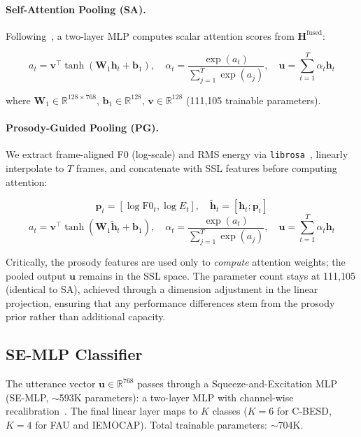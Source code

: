 \documentclass[11pt,a4paper]{article}
\begin{document}
\paragraph{Self-Attention Pooling (SA).}
Following~\cite{lin2017structured}, a two-layer MLP computes scalar attention
scores from $\mathbf{H}^{\text{fused}}$:

\begin{equation}
a_t = \mathbf{v}^\top \tanh(\mathbf{W}_1 \mathbf{h}_t + \mathbf{b}_1), \quad
\alpha_t = \frac{\exp(a_t)}{\sum_{j=1}^{T} \exp(a_j)}, \quad
\mathbf{u} = \sum_{t=1}^{T} \alpha_t \mathbf{h}_t
\end{equation}

where $\mathbf{W}_1 \in \mathbb{R}^{128 \times 768}$,
$\mathbf{b}_1 \in \mathbb{R}^{128}$, $\mathbf{v} \in \mathbb{R}^{128}$
(111,105 trainable parameters).

\paragraph{Prosody-Guided Pooling (PG).}
We extract frame-aligned F0 (log-scale) and RMS energy via
\texttt{librosa}~\cite{mcfee2015librosa}, linearly interpolate to $T$ frames,
and concatenate with SSL features before computing attention:

\begin{equation}
\mathbf{p}_t = [\log\text{F0}_t, \log E_t], \quad
\tilde{\mathbf{h}}_t = [\mathbf{h}_t; \mathbf{p}_t]
\end{equation}
\begin{equation}
a_t = \mathbf{v}^\top \tanh(\mathbf{W}_1 \tilde{\mathbf{h}}_t + \mathbf{b}_1), \quad
\alpha_t = \frac{\exp(a_t)}{\sum_{j=1}^{T} \exp(a_j)}, \quad
\mathbf{u} = \sum_{t=1}^{T} \alpha_t \mathbf{h}_t
\end{equation}

Critically, the prosody features are used only to \textit{compute} attention
weights; the pooled output $\mathbf{u}$ remains in the SSL space. The
parameter count stays at 111,105 (identical to SA), achieved through a
dimension adjustment in the linear projection, ensuring that any performance
differences stem from the prosody prior rather than additional capacity.

\subsection{SE-MLP Classifier}
\label{ssec:classifier}

The utterance vector $\mathbf{u} \in \mathbb{R}^{768}$ passes through a
Squeeze-and-Excitation MLP (SE-MLP, $\sim$593K parameters): a two-layer MLP
with channel-wise recalibration~\cite{hu2018senet}. The final linear layer maps
to $K$ classes ($K=6$ for C-BESD, $K=4$ for FAU and IEMOCAP). Total trainable
parameters: $\sim$704K.
\end{document}
